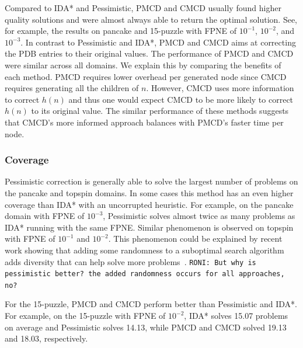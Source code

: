 \documentclass{article}
\newcommand{\roni}[1]{\mbox{\tt RONI: #1}}
\begin{document}
Compared to IDA* and Pessimistic, PMCD and CMCD usually found higher quality solutions  and were almost always able to return the optimal solution. See, for example, the results on pancake and 15-puzzle with FPNE of $10^{-1}$, $10^{-2}$, and $10^{-3}$. %
In contrast to Pessimistic and IDA*, PMCD and CMCD aims at correcting the PDB entries to their original values. %
%
The performance of PMCD and CMCD were similar across all domains. We explain this by comparing the benefits of each method. PMCD requires lower overhead per generated node since CMCD requires generating all the children of $n$. However, CMCD uses more information to correct $h(n)$ and thus one would expect CMCD to be more likely to correct $h(n)$ to its original value. The similar performance of these methods suggests that CMCD's more informed approach balances with PMCD's faster time per node.

\subsubsection{Coverage}

Pessimistic correction is generally able to solve the largest number of problems on the pancake and topspin domains. In some cases this method has an even higher coverage than IDA* with an uncorrupted heuristic. For example, on the pancake domain with FPNE of $10^{-3}$, Pessimistic solves almost twice as many problems as IDA* running with the same FPNE. %
Similar phenomenon is observed on topspin with FPNE of $10^{-1}$ and $10^{-2}$. %
This phenomenon could be explained by recent work showing that adding some randomness to a suboptimal search algorithm adds diversity that can help solve more problems~\cite{valenzano2014comparison}. \roni{But why is pessimistic better? the added randomness occurs for all approaches, no?}

For the 15-puzzle, PMCD and CMCD perform better than Pessimistic and IDA*. For example, on the 15-puzzle with FPNE of $10^{-2}$, IDA* solves 15.07 problems on average and Pessimistic solves 14.13, while PMCD and CMCD solved 19.13 and 18.03, respectively. 
\end{document}
